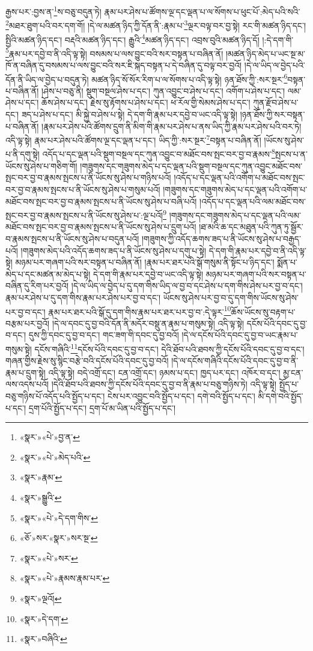 རྒྱས་པར་:བྱས་ན་\footnote{«སྣར་»«པེ་»བྱ་ན་}ས་བཅུ་བདུན་ཏེ། རྣམ་པར་ཤེས་པ་ཚོགས་ལྔ་དང་ལྡན་པ་ལ་སོགས་པ་ཕུང་པོ་:མེད་པའི་སའི་\footnote{«སྣར་»«པེ་»མེད་པའི་}མཐར་ཐུག་པའི་བར་དག་གོ། །དེ་ལ་མཚན་ཉིད་ཀྱི་དོན་ནི་:རྣམ་པ་\footnote{«སྣར་»རྣམ་}ལྔར་བལྟ་བར་བྱ་སྟེ། རང་གི་མཚན་ཉིད་དང་། སྤྱིའི་མཚན་ཉིད་དང་། བརྡའི་མཚན་ཉིད་དང་། རྒྱུའི་\footnote{«སྣར་»སྒྱུའི་}མཚན་ཉིད་དང་། འབྲས་བུའི་མཚན་ཉིད་དོ། །:དེ་དག་གི་\footnote{«སྣར་»«པེ་»དེ་དག་གིས་}རྣམ་པར་དབྱེ་བ་ནི་འདི་ལྟ་སྟེ། བསམས་པ་ལས་བྱུང་བའི་སར་བསྟན་པ་བཞིན་ནོ། །མཚན་ཉིད་མེད་པ་ཡང་སྔ་མ་ཁོ་ན་བཞིན་དུ་བསམས་པ་ལས་བྱུང་བའི་སར་ཇི་སྐད་བསྟན་པ་དེ་བཞིན་དུ་བལྟ་བར་བྱའོ། །དེ་ལ་ཡིད་ལ་བྱེད་པའི་དོན་ནི་ཡིད་ལ་བྱེད་པ་བདུན་ཏེ། མཚན་ཉིད་སོ་སོར་རིག་པ་ལ་སོགས་པ་འདི་ལྟ་སྟེ། ཉན་ཐོས་ཀྱི་:སར་སྔར་\footnote{«ཅོ་»སར་«སྣར་»སར་སྔ་}བསྟན་པ་བཞིན་ནོ། །ཤེས་པ་བཅུ་ནི། སྡུག་བསྔལ་ཤེས་པ་དང་། ཀུན་འབྱུང་བ་ཤེས་པ་དང་། འགོག་པ་ཤེས་པ་དང་། ལམ་ཤེས་པ་དང་། ཆོས་ཤེས་པ་དང་། རྗེས་སུ་རྟོགས་པ་ཤེས་པ་དང་། ཕ་རོལ་གྱི་སེམས་ཤེས་པ་དང་། ཀུན་རྫོབ་ཤེས་པ་དང་། ཟད་པ་ཤེས་པ་དང་། མི་སྐྱེ་བ་ཤེས་པ་སྟེ། དེ་དག་གི་རྣམ་པར་དབྱེ་བ་ཡང་འདི་ལྟ་སྟེ། །ཉན་ཐོས་ཀྱི་སར་བསྟན་པ་བཞིན་ནོ། །རྣམ་པར་ཤེས་པའི་ཚོགས་དྲུག་ནི་མིག་གི་རྣམ་པར་ཤེས་པ་ནས་ཡིད་ཀྱི་རྣམ་པར་ཤེས་པའི་བར་ཏེ། འདི་ལྟ་སྟེ། རྣམ་པར་ཤེས་པའི་ཚོགས་ལྔ་དང་ལྡན་པ་དང་། ཡིད་ཀྱི་:སར་སྔར་\footnote{«སྣར་»«པེ་»སར་}བསྟན་པ་བཞིན་ནོ། །ཡོངས་སུ་ཤེས་པ་ནི་དགུ་སྟེ། འདོད་པ་དང་ལྡན་པའི་སྡུག་བསྔལ་དང་ཀུན་འབྱུང་བ་མཐོང་བས་སྤང་བར་བྱ་བ་རྣམས་\footnote{«སྣར་»«པེ་»རྣམས་རྣམ་པར་}སྤངས་པ་ན་ཡོངས་སུ་ཤེས་པ་གཅིག་གོ། །གཟུགས་དང་གཟུགས་མེད་པ་དང་ལྡན་པའི་སྡུག་བསྔལ་དང་ཀུན་འབྱུང་མཐོང་བས་སྤང་བར་བྱ་བ་རྣམས་སྤངས་པ་ནི་ཡོངས་སུ་ཤེས་པ་གཉིས་པའོ། །འདོད་པ་དང་ལྡན་པའི་འགོག་པ་མཐོང་བས་སྤང་བར་བྱ་བ་རྣམས་སྤངས་པ་ནི་ཡོངས་སུ་ཤེས་པ་གསུམ་པའོ། །གཟུགས་དང་གཟུགས་མེད་པ་དང་ལྡན་པའི་འགོག་པ་མཐོང་བས་སྤང་བར་བྱ་བ་རྣམས་སྤངས་པ་ནི་ཡོངས་སུ་ཤེས་པ་བཞི་པའོ། །འདོད་པ་དང་ལྡན་པའི་ལམ་མཐོང་བས་སྤང་བར་བྱ་བ་རྣམས་སྤངས་པ་ནི་ཡོངས་སུ་ཤེས་པ་:ལྔ་པའོ།\footnote{«སྣར་»ལྔའོ།} །གཟུགས་དང་གཟུགས་མེད་པ་དང་ལྡན་པའི་ལམ་མཐོང་བས་སྤང་བར་བྱ་བ་རྣམས་སྤངས་པ་ནི་ཡོངས་སུ་ཤེས་པ་དྲུག་པའོ། །ཐ་མའི་ཆ་དང་མཐུན་པའི་ཀུན་ཏུ་སྦྱོར་བ་རྣམས་སྤངས་པ་ནི་ཡོངས་སུ་ཤེས་པ་བདུན་པའོ། །གཟུགས་ཀྱི་འདོད་ཆགས་ཟད་པ་ནི་ཡོངས་སུ་ཤེས་པ་བརྒྱད་པའོ། །གཟུགས་མེད་པའི་འདོད་ཆགས་ཟད་པ་ནི་ཡོངས་སུ་ཤེས་པ་དགུ་པ་སྟེ། དེ་དག་གི་རྣམ་པར་དབྱེ་བ་ནི་འདི་ལྟ་སྟེ། མཉམ་པར་གཞག་པའི་སར་བསྟན་པ་བཞིན་ནོ། །རྣམ་པར་ཐར་པའི་སྒོ་གསུམ་ནི་སྟོང་པ་ཉིད་དང་། སྨོན་པ་མེད་པ་དང་མཚན་མ་མེད་པ་སྟེ། དེ་དག་གི་རྣམ་པར་དབྱེ་བ་ཡང་འདི་ལྟ་སྟེ། མཉམ་པར་གཞག་པའི་སར་བསྟན་པ་བཞིན་དུ་རིག་པར་བྱའོ། །དེ་ལ་ཡིད་ལ་བྱེད་པ་དུ་དག་གིས་ཡིད་ལ་བྱ་བ་དང་ཤེས་པ་དག་གིས་ཤེས་པར་བྱ་བ་དང་། རྣམ་པར་ཤེས་པ་དུ་དག་གིས་རྣམ་པར་ཤེས་པར་བྱ་བ་དང་། ཡོངས་སུ་ཤེས་པར་བྱ་བ་དུ་དག་གིས་ཡོངས་སུ་ཤེས་པར་བྱ་བ་དང་། རྣམ་པར་ཐར་པའི་སྒོ་དུ་དག་གིས་རྣམ་པར་ཐར་པར་བྱ་བ་:དེ་ལྟར་\footnote{«སྣར་»དེ་དག་}ཆོས་ཡོངས་སུ་བརྟག་པ་བརྩམ་པར་བྱའོ། །དེ་ལ་དབང་དུ་བྱ་བའི་དོན་ནི་མདོར་བསྡུ་ན་རྣམ་པ་གསུམ་སྟེ། འདི་ལྟ་སྟེ། དངོས་པོའི་དབང་དུ་བྱ་བ་དང་། དུས་ཀྱི་དབང་དུ་བྱ་བ་དང་། གང་ཟག་གི་དབང་དུ་བྱ་བའོ། །དེ་ལ་དངོས་པོའི་དབང་དུ་བྱ་བ་ཡང་རྣམ་པ་གསུམ་སྟེ། དངོས་གཞིའི་\footnote{«སྣར་»བཞིའི་}དངོས་པོའི་དབང་དུ་བྱ་བ་དང་། དེའི་ཐོབ་པའི་ཐབས་ཀྱི་དངོས་པོའི་དབང་དུ་བྱ་བ་དང་། གཞན་གྱིས་རྗེས་སུ་སྙིང་བརྩེ་བའི་དངོས་པོའི་དབང་དུ་བྱ་བའོ། །དེ་ལ་དངོས་གཞིའི་དངོས་པོའི་དབང་དུ་བྱ་བ་ནི་རྣམ་པ་དྲུག་སྟེ། འདི་ལྟ་སྟེ། བདེ་འགྲོ་དང་། ངན་འགྲོ་དང་། ཉམས་པ་དང་། ཁྱད་པར་དང་། འཁོར་བ་དང་། མྱ་ངན་ལས་འདས་པའོ། །དེའི་ཐོབ་པའི་ཐབས་ཀྱི་དངོས་པོའི་དབང་དུ་བྱ་བ་ནི་རྣམ་པ་བཅུ་གཉིས་ཏེ། འདི་ལྟ་སྟེ། སྤྱོད་པ་བཅུ་གཉིས་པོ་འདོད་པའི་སྤྱོད་པ་དང་། ངེས་པར་འབྱུང་བའི་སྤྱོད་པ་དང་། དགེ་བའི་སྤྱོད་པ་དང་། མི་དགེ་བའི་སྤྱོད་པ་དང་། དྲག་པོའི་སྤྱོད་པ་དང་། དྲག་པོ་མ་ཡིན་པའི་སྤྱོད་པ་དང་། 